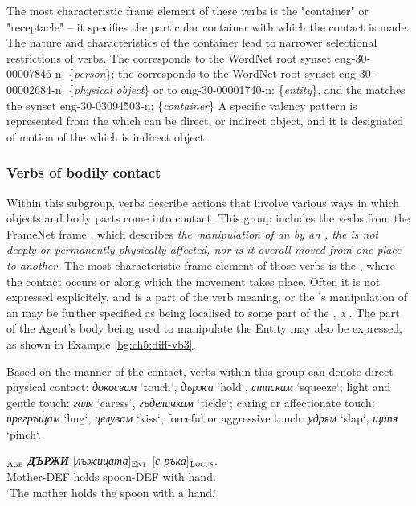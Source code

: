 \documentclass[output=paper,colorlinks,citecolor=brown]{langscibook}
\begin{document}
The most characteristic frame element of these verbs is the "container" or "receptacle" -- it specifies the particular container with which the contact is made. The nature and characteristics of the container lead to narrower selectional restrictions of verbs. The  corresponds to the WordNet root synset eng-30-00007846-n: \{\textit{person}\}; the  corresponds to the WordNet root synset eng-30-00002684-n: \{\textit{physical object}\} or to eng-30-00001740-n: \{\textit{entity}\}, and the  matches the synset eng-30-03094503-n: \{\textit{container}\}
A specific valency pattern is represented from the  which can be  direct, or indirect object, and it is designated  of motion of the  which is indirect object.

\subsubsection {Verbs of bodily contact} \label{4.3.1.3}
Within this subgroup, verbs describe actions that involve various ways in which objects and body parts come into contact. This group includes the verbs from the FrameNet frame , which describes \textit{the manipulation of an  by an , the  is not deeply or permanently physically affected, nor is it overall moved from one place to another.} The most characteristic frame element of those verbs is the , where the contact occurs or along which the movement takes place. Often it is not expressed explicitely, and is a part of the verb meaning, or the 's manipulation of an  may be further specified as being localised to some part of the , a . The part of the Agent's body being used to manipulate the Entity may also be expressed, as shown in Example \ref{bg:ch5:diff-vb3}.

Based on the manner of the contact, verbs within this group can denote direct physical contact: \textit{докосвам} `touch`, \textit{държа} `hold`, \textit{стискам} `squeeze`; light and gentle touch: \textit{галя} `caress`, \textit{гъделичкам} `tickle`; caring or affectionate touch: \textit{прегръщам} `hug`, \textit{целувам} `kiss`; forceful or aggressive touch: \textit{удрям} `slap`, \textit{щи\-пя} `pinch`.

\begin{exe} 
\ex \label{bg:ch5:diff-vb3}
$_{\text{\textsc{Age}}}$ \textit{\textbf{ДЪРЖИ}} [\textit{лъжицата}]$_{\text{\textsc{Ent}}}$ [\textit{с ръка}]$_{\text{\textsc{Locus}}}$.\\
Mother-DEF holds spoon-DEF {with hand}. \\ 
\glt `The mother holds the spoon with a hand.` 
\end{exe}
\end{document}
